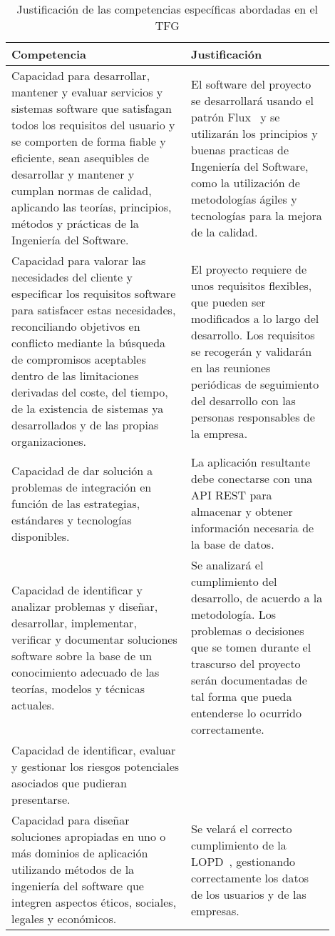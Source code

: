 \documentclass{pre-tfg}
\begin{document}
\clearpage


\begin{table}[hp]
  \centering
  \caption{Justificación de las competencias específicas abordadas en el TFG}
  \label{tab:competencias}

  \begin{tabular}{p{0.5\linewidth}p{0.4\linewidth}}
    \textbf{Competencia} & \textbf{Justificación} \\
    \hline
    Capacidad para desarrollar, mantener y evaluar servicios y sistemas software que satisfagan
    todos los requisitos del usuario y se comporten de forma fiable y eficiente, sean asequibles
    de desarrollar y mantener y cumplan normas de calidad, aplicando las teorías, principios,
    métodos y prácticas de la Ingeniería del Software.
    & El software del proyecto se desarrollará usando el patrón Flux~\cite{FLUX} y se utilizarán los principios
    y buenas practicas de Ingeniería del Software, como la utilización de metodologías ágiles y
    tecnologías para la mejora de la calidad.\\
    Capacidad para valorar las necesidades del cliente y especificar los requisitos software para
    satisfacer estas necesidades, reconciliando objetivos en conflicto mediante la búsqueda de
    compromisos aceptables dentro de las limitaciones derivadas del coste, del tiempo, de la existencia
    de sistemas ya desarrollados y de las propias organizaciones.
    & El proyecto requiere de unos requisitos flexibles, que pueden ser modificados a lo largo del
    desarrollo. Los requisitos se recogerán y validarán en las reuniones periódicas de seguimiento
    del desarrollo con las personas responsables de la empresa.\\
    Capacidad de dar solución a problemas de integración en función de las estrategias, estándares
    y tecnologías disponibles.
    & La aplicación resultante debe conectarse con una API REST para almacenar y obtener información
    necesaria de la base de datos.\\
    Capacidad de identificar y analizar problemas y diseñar, desarrollar, implementar, verificar y
    documentar soluciones software sobre la base de un conocimiento adecuado de las teorías, modelos
    y técnicas actuales.
    & Se analizará el cumplimiento del desarrollo, de acuerdo a la metodología. Los problemas o
    decisiones que se tomen durante el trascurso del proyecto serán documentadas de tal forma que
    pueda entenderse lo ocurrido correctamente. \\
    Capacidad de identificar, evaluar y gestionar los riesgos potenciales asociados que pudieran presentarse.
    & \\
    Capacidad para diseñar soluciones apropiadas en uno o más dominios de aplicación utilizando métodos
    de la ingeniería del software que integren aspectos éticos, sociales, legales y económicos.
    & Se velará el correcto cumplimiento de la LOPD~\cite{LOPD}, gestionando correctamente los datos de los
    usuarios y de las empresas.\\
    \hline
  \end{tabular}
\end{table}
\end{document}
